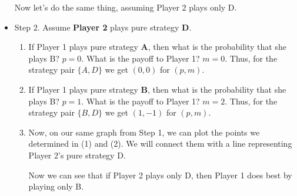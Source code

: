 \begin{itemize}
Now let's do the same thing, assuming Player 2 plays only D.
\item  Step 2. Assume {\bf Player 2} plays pure strategy {\bf D}.
\begin{enumerate}
\item If Player 1 plays pure strategy {\bf A}, then what is the probability that she plays B? $p=0$. What is the payoff to Player 1? $m=0$. Thus, for the strategy pair $\{A, D\}$ we get $(0, 0)$ for $(p, m)$.
\item If Player 1 plays pure strategy {\bf B}, then what is the probability that she plays B? $p=1$. What is the payoff to Player 1? $m=2$. Thus, for the strategy pair $\{B, D\}$ we get $(1, -1)$ for $(p, m)$.
\item Now, on our same graph from Step 1, we can plot the points we determined in (1) and (2). We will connect them with a line representing Player 2's pure strategy D.


\begin{figure}
\begin{center}
   \label{Player 2's pure strategy $D$}
\end{center}   
\end{figure}

Now we can see that if Player 2 plays only D, then Player 1 does best by playing only B.
\end{enumerate}

\end{itemize}

